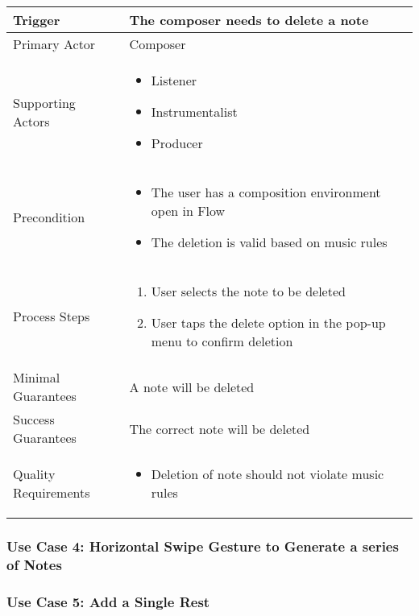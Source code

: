 \begin{tabularx}{\textwidth}{|X|X|}
\hline
Trigger & 
The composer needs to delete a note \\
\hline
Primary Actor & 
Composer\\
\hline
Supporting Actors & 
\begin{itemize}
\item Listener
\item Instrumentalist
\item Producer
\end{itemize} \\
\hline
Precondition & 
\begin{itemize}
\item The user has a composition environment open in Flow 
\item The deletion is valid based on music rules
\end{itemize} \\
\hline
Process Steps & 
\begin{enumerate}
\item User selects the note to be deleted 
\item User taps the delete option in the pop-up menu to confirm deletion
\end{enumerate} \\
\hline
Minimal Guarantees & 
A note will be deleted \\
\hline
Success Guarantees & 
The correct note will be deleted \\
\hline
Quality Requirements & 
\begin{itemize}
\item Deletion of note should not violate music rules
\end{itemize} \\ 
\hline
\end{tabularx}

\subsubsection{Use Case 4: Horizontal Swipe Gesture to Generate a series of Notes}


\subsubsection{Use Case 5: Add a Single Rest}

